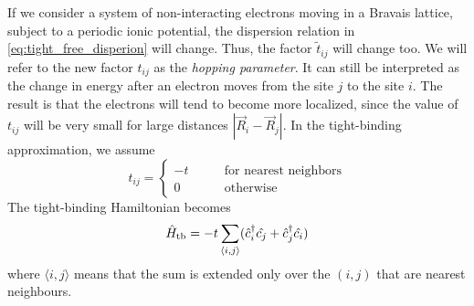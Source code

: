 If we consider a system of non-interacting electrons moving in a Bravais lattice, subject to a periodic ionic potential, the dispersion relation in \cref{eq:tight_free_disperion} will change. Thus, the factor $\tilde{t}_{ij}$ will change too. We will refer to the new factor $t_{ij}$ as the \emph{hopping parameter}. It can still be interpreted as the change in energy after an electron moves from the site $j$ to the site $i$. The result is that the electrons will tend to become more localized, since the value of $t_{ij}$ will be very small for large distances $|\vec{R}_i - \vec{R}_j|$. In the tight-binding approximation, we assume
\begin{equation}
    t_{ij} =
    \begin{cases}
        -t \qquad                                     & \text{for nearest neighbors} \\
        0                                      \qquad & \text{otherwise}
    \end{cases}
\end{equation}
The tight-binding Hamiltonian becomes
\begin{equation} \label{eq:tight_hamiltonian_position}
    \hat{H}_\text{tb} = -t \sum_{\langle i,j \rangle} (\hat{c}^\dagger_i\hat{c_j} +  \hat{c}^\dagger_j\hat{c_i})
\end{equation}
where ${\langle i,j \rangle}$ means that the sum is extended only over the $(i,j)$ that are nearest neighbours.

